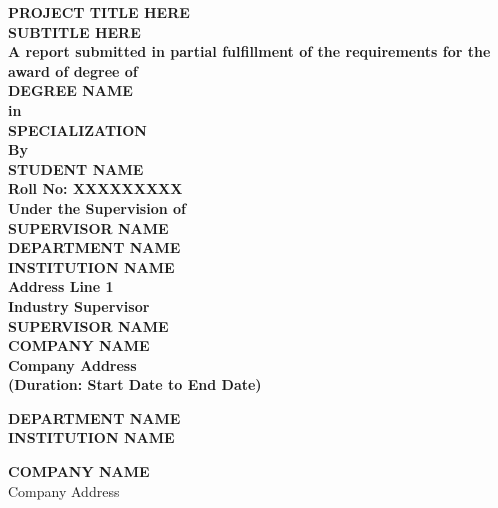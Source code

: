 \documentclass[a4paper,11pt,oneside]{report}
\numberwithin{equation}{section}
\begin{document}
\begin{titlepage}
    \centering
    \textbf{\LARGE PROJECT TITLE HERE}\\[0.3cm]
    \textbf{\LARGE SUBTITLE HERE}\\[0.8cm]
    
    \textbf{\large A report submitted in partial fulfillment of the requirements for the award of degree of} \\[0.8cm]
    
    \textbf{\LARGE DEGREE NAME}\\[0.2cm]
    \textbf{\large in}\\[0.2cm]
    \textbf{\LARGE SPECIALIZATION}\\[0.6cm]
    
    \textbf{By}\\[0.2cm]
    \textbf{\large STUDENT NAME}\\[0.2cm]
    \textbf{Roll No: XXXXXXXXX}\\[0.6cm]
    
    \textbf{Under the Supervision of}\\[0.2cm]
    \textbf{\large SUPERVISOR NAME}\\[0.2cm]
    \textbf{DEPARTMENT NAME}\\[0.2cm]
    \textbf{INSTITUTION NAME}\\[0.2cm]
    \textbf{Address Line 1}\\[0.6cm]
    
    \textbf{Industry Supervisor}\\[0.2cm]
    \textbf{\large SUPERVISOR NAME}\\[0.2cm]
    \textbf{COMPANY NAME}\\[0.2cm]
    \textbf{Company Address}\\[0.2cm]
    \textbf{(Duration: Start Date to End Date)}\\[1cm]
    
    \begin{minipage}[t]{0.45\linewidth}
        \textbf{DEPARTMENT NAME}\\
        \textbf{INSTITUTION NAME}
    \end{minipage}
    \hfill
    \begin{minipage}[t]{0.45\linewidth}
        \textbf{COMPANY NAME}\\
        \small{Company Address}
    \end{minipage}
\end{titlepage}
\end{document}
